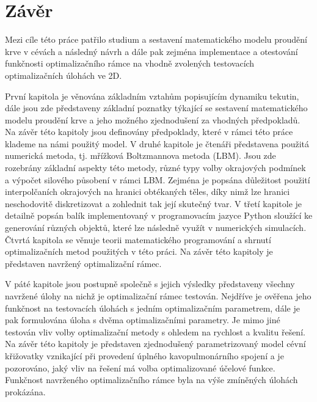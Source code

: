 \chapter*{Závěr}


\pagestyle{plain}


Mezi cíle této práce patřilo studium a sestavení matematického modelu proudění krve v cévách a následný návrh a dále pak zejména implementace a otestování funkčnosti optimalizačního rámce na vhodně zvolených testovacích optimalizačních úlohách ve 2D.

První kapitola je věnována základním vztahům popisujícím dynamiku tekutin, dále jsou zde představeny základní poznatky týkající se sestavení matematického modelu proudění krve a jeho možného zjednodušení za vhodných předpokladů. Na závěr této kapitoly jsou definovány předpoklady, které v rámci této práce klademe na námi použitý model. V druhé kapitole je čtenáři představena použitá numerická metoda, tj. mřížková Boltzmannova metoda (LBM). Jsou zde rozebrány základní aspekty této metody, různé typy volby okrajových podmínek a výpočet silového působení v rámci LBM. Zejména je popsána důležitost použití interpolčaních okrajových na hranici obtékaných těles, díky nimž lze hranici neschodovitě diskretizovat a zohlednit tak její skutečný tvar. V třetí kapitole je detailně popsán balík implementovaný v programovacím jazyce Python sloužící ke generování různých objektů, které lze následně využít v numerických simulacích. Čtvrtá kapitola se věnuje teorii matematického programování a shrnutí optimalizačních metod použitých v této práci. Na závěr této kapitoly je představen navržený optimalizační rámec.

V páté kapitole jsou postupně společně s jejich výsledky představeny všechny navržené úlohy na nichž je optimalizační rámec testován. Nejdříve je ověřena jeho funkčnost na testovacích úlohách s jedním optimalizačním parametrem, dále je pak formulována úloha s dvěma optimalizačními parametry. Je mimo jiné testován vliv volby optimalizační metody s ohledem na rychlost a kvalitu řešení. Na závěr této kapitoly je představen zjednodušený parametrizovaný model cévní křižovatky vznikající při provedení úplného kavopulmonárního spojení a je pozorováno, jaký vliv na řešení má volba optimalizované účelové funkce. Funkčnost navrženého optimalizačního rámce byla na výše zmíněných úlohách prokázána.

